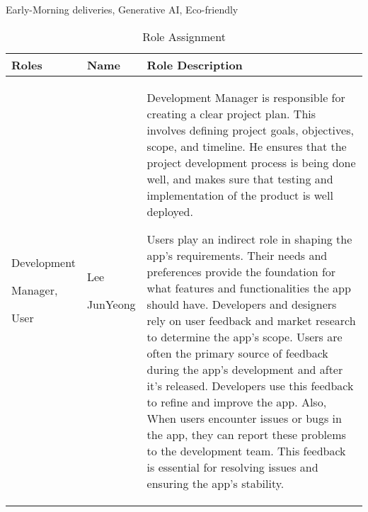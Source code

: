 \documentclass[conference]{IEEEtran}
\begin{document}
\begin{IEEEkeywords}
Early-Morning deliveries, Generative AI, Eco-friendly
\end{IEEEkeywords}

\begin{table}[ht]
\caption{Role Assignment}
\begin{tabular}{| p{1.3cm}|p{1cm}|p{5.5cm} |}

\hline
Roles & Name & Role Description\\
\hline
Development \par Manager, \par User 
& Lee \par JunYeong 
& Development Manager is responsible for creating a clear project plan. This involves defining project goals, objectives, scope, and timeline. He ensures that the project development process is being done well, and makes sure that testing and implementation of the product is well deployed. \par
Users play an indirect role in shaping the app's requirements. Their needs and preferences provide the foundation for what features and functionalities the app should have. Developers and designers rely on user feedback and market research to determine the app's scope. Users are often the primary source of feedback during the app's development and after it's released. Developers use this feedback to refine and improve the app. Also, When users encounter issues or bugs in the app, they can report these problems to the development team. This feedback is essential for resolving issues and ensuring the app's stability.\\
\hline
\end{tabular}
\end{table}
\end{document}
